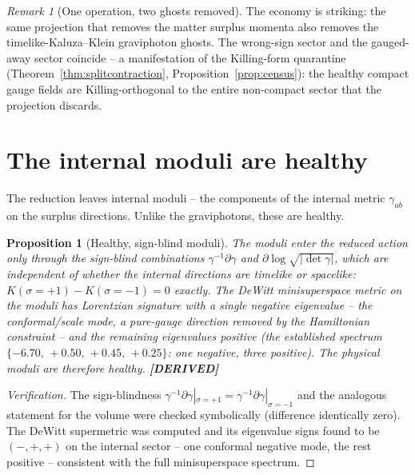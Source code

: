\documentclass[11pt,oneside]{book}
\newcommand{\status}[1]{{\sffamily\bfseries\color{statuscol}[#1]}}
\theoremstyle{plain}
\newtheorem{proposition}[theorem]{Proposition}
\theoremstyle{definition}
\theoremstyle{remark}
\newtheorem{remark}[theorem]{Remark}
\begin{document}
\begin{remark}[One operation, two ghosts removed]
The economy is striking: the same projection that removes the matter surplus
momenta also removes the timelike-Kaluza--Klein graviphoton ghosts. The wrong-sign
sector and the gauged-away sector coincide -- a manifestation of the Killing-form
quarantine (Theorem~\ref{thm:splitcontraction}, Proposition~\ref{prop:census}): the
healthy compact gauge fields are Killing-orthogonal to the entire non-compact sector
that the projection discards.
\end{remark}

\section{The internal moduli are healthy}
\label{sec:moduli}

The reduction leaves internal moduli -- the components of the internal metric
$\gamma_{ab}$ on the surplus directions. Unlike the graviphotons, these are healthy.

\begin{proposition}[Healthy, sign-blind moduli]
\label{prop:moduli}
The moduli enter the reduced action only through the sign-blind combinations
$\gamma^{-1}\partial\gamma$ and $\partial\log\sqrt{|\det\gamma|}$, which are
independent of whether the internal directions are timelike or spacelike:
$K(\sigma{=}+1)-K(\sigma{=}-1)=0$ exactly. The DeWitt minisuperspace metric on the
moduli has Lorentzian signature with a single negative eigenvalue -- the
conformal/scale mode, a pure-gauge direction removed by the Hamiltonian constraint
-- and the remaining eigenvalues positive (the established spectrum
$\{-6.70,\,+0.50,\,+0.45,\,+0.25\}$: one negative, three positive). The physical
moduli are therefore healthy. \status{DERIVED}
\end{proposition}

\begin{proof}[Verification]
The sign-blindness $\gamma^{-1}\partial\gamma|_{\sigma=+1}=\gamma^{-1}
\partial\gamma|_{\sigma=-1}$ and the analogous statement for the volume were checked
symbolically (difference identically zero). The DeWitt supermetric was computed and
its eigenvalue signs found to be $(-,+,+)$ on the internal sector -- one conformal
negative mode, the rest positive -- consistent with the full minisuperspace spectrum.
\end{proof}
\end{document}
